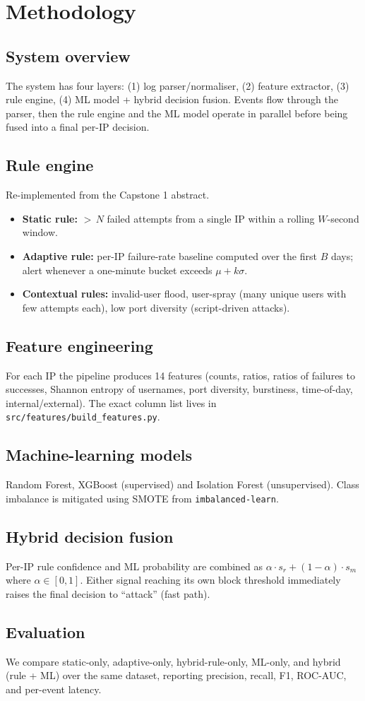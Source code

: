 \chapter{Methodology}

\section{System overview}
The system has four layers: (1) log parser/normaliser, (2) feature
extractor, (3) rule engine, (4) ML model + hybrid decision fusion. Events
flow through the parser, then the rule engine and the ML model operate in
parallel before being fused into a final per-IP decision.

\section{Rule engine}
Re-implemented from the Capstone 1 abstract.
\begin{itemize}
  \item \textbf{Static rule:} $>\,N$ failed attempts from a single IP within
        a rolling $W$-second window.
  \item \textbf{Adaptive rule:} per-IP failure-rate baseline computed over the
        first $B$ days; alert whenever a one-minute bucket exceeds
        $\mu + k\sigma$.
  \item \textbf{Contextual rules:} invalid-user flood, user-spray
        (many unique users with few attempts each), low port diversity
        (script-driven attacks).
\end{itemize}

\section{Feature engineering}
For each IP the pipeline produces 14 features (counts, ratios, ratios of
failures to successes, Shannon entropy of usernames, port diversity,
burstiness, time-of-day, internal/external). The exact column list lives in
\texttt{src/features/build\_features.py}.

\section{Machine-learning models}
Random Forest, XGBoost (supervised) and Isolation Forest (unsupervised).
Class imbalance is mitigated using SMOTE from \texttt{imbalanced-learn}.

\section{Hybrid decision fusion}
Per-IP rule confidence and ML probability are combined as
$\alpha \cdot s_r + (1-\alpha) \cdot s_m$ where $\alpha \in [0, 1]$.
Either signal reaching its own block threshold immediately raises the
final decision to ``attack'' (fast path).

\section{Evaluation}
We compare static-only, adaptive-only, hybrid-rule-only, ML-only, and
hybrid (rule + ML) over the same dataset, reporting precision, recall,
F1, ROC-AUC, and per-event latency.
